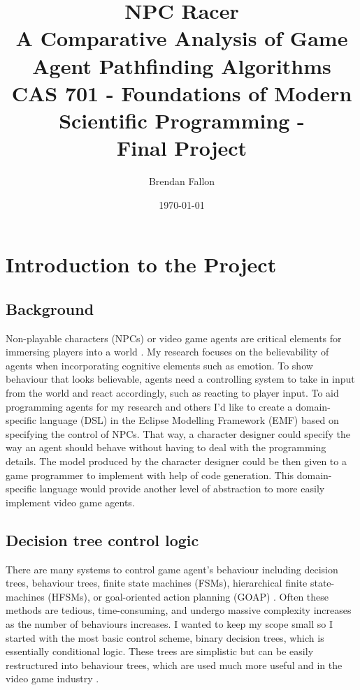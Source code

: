 \documentclass[letterpaper,12pt]{article}  %
\title{ %
    NPC Racer \\
    \large A Comparative Analysis of Game Agent Pathfinding Algorithms \\
    CAS 701 - Foundations of Modern Scientific Programming - \\
    Final Project}
\date{\today{}} %
\author{Brendan Fallon}
\begin{document}

\maketitle  %

\tableofcontents  %

\section{Introduction to the Project}
\subsection{Background}
Non-playable characters (NPCs) or video game agents are critical elements for immersing players into a world \cite{noauthor_toby_nodate}. My research focuses on the believability of agents when incorporating cognitive elements such as emotion. To show behaviour that looks believable, agents need a controlling system to take in input from the world and react accordingly, such as reacting to player input. To aid programming agents for my research and others I’d like to create a domain-specific language (DSL) in the Eclipse Modelling Framework (EMF) based on specifying the control of NPCs. That way, a character designer could specify the way an agent should behave without having to deal with the programming details. The model produced by the character designer could be then given to a game programmer to implement with help of code generation. This domain-specific language would provide another level of abstraction to more easily implement video game agents.

\subsection{Decision tree control logic}
There are many systems to control game agent's behaviour including decision trees, behaviour trees, finite state machines (FSMs), hierarchical finite state-machines (HFSMs), or goal-oriented action planning (GOAP) \cite{ai_and_games_behaviour_2019}. Often these methods are tedious, time-consuming, and undergo massive complexity increases as the number of behaviours increases. I wanted to keep my scope small so I started with the most basic control scheme, binary decision trees, which is essentially conditional logic. These trees are simplistic but can be easily restructured into behaviour trees, which are used much more useful and in the video game industry \cite{ai_and_games_behaviour_2019}.
\end{document}
